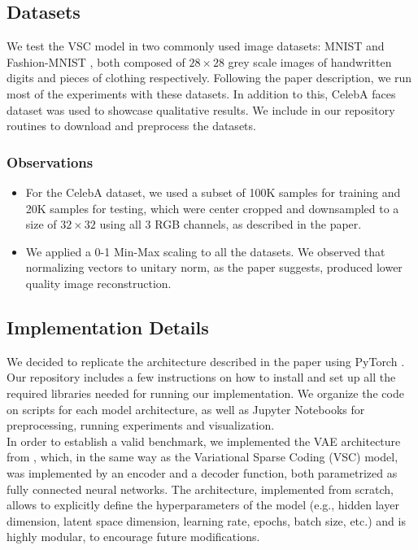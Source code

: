 \subsection{Datasets}

We test the VSC model in two commonly used image datasets: MNIST \supercite{lecun1998gradient} and Fashion-MNIST \supercite{xiao2017fashion}, both composed of $28 \times 28$ grey scale images of handwritten digits and pieces of clothing respectively. Following the paper description, we run most of the experiments with these datasets. In addition to this, CelebA faces \supercite{liu2015deep} dataset was used to showcase qualitative results. We include in our repository routines to download and preprocess the datasets.

\subsubsection{Observations}

\begin{itemize}
    \item For the CelebA dataset, we used a subset of 100K samples for training and 20K samples for testing, which were center cropped and downsampled to a size of $32 \times 32$ using all $3$ RGB channels, as described in the paper. 
    \item We applied a 0-1 Min-Max scaling to all the datasets. We observed that normalizing vectors to unitary norm, as the paper suggests, produced lower quality image reconstruction.
\end{itemize}

\subsection{Implementation Details}

We decided to replicate the architecture described in the paper using PyTorch \supercite{paszke2017automatic}. Our repository includes a few instructions on how to install and set up all the required libraries needed for running our implementation.  We organize the code on scripts for each model architecture, as well as Jupyter Notebooks for preprocessing, running experiments and visualization. \\

In order to establish a valid benchmark, we implemented the VAE architecture from \supercite{Kingma2013}, which, in the same way as the Variational Sparse Coding (VSC) model, was implemented by an encoder and a decoder function, both parametrized as fully connected neural networks. The architecture, implemented from scratch, allows to explicitly define the hyperparameters of the model (e.g., hidden layer dimension, latent space dimension, learning rate, epochs, batch size, etc.) and is highly modular, to encourage future modifications. \\

